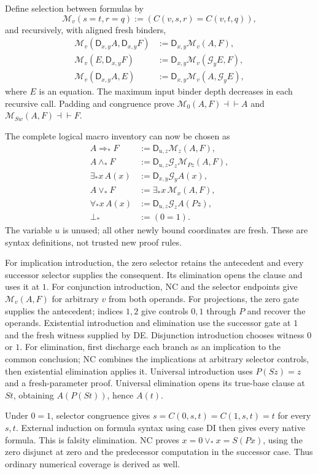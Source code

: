 \documentclass[11pt]{article}
\theoremstyle{definition}
\newcommand{\D}{\mathsf D}
\newcommand{\G}{\mathcal G}
\newcommand{\M}{\mathcal M}
\begin{document}
Define selection between formulas by
\[
 \M_v(s=t,r=q):=(C(v,s,r)=C(v,t,q)),
\]
and recursively, with aligned fresh binders,
\begin{align*}
 \M_v(\D_{x,y}A,\D_{x,y}F)&:=\D_{x,y}\M_v(A,F),\\
 \M_v(E,\D_{x,y}F)&:=\D_{x,y}\M_v(\G_yE,F),\\
 \M_v(\D_{x,y}A,E)&:=\D_{x,y}\M_v(A,\G_yE),
\end{align*}
where $E$ is an equation. The maximum input binder depth decreases in
each recursive call. Padding and congruence prove
$\M_0(A,F)\dashv\vdash A$ and
$\M_{Sw}(A,F)\dashv\vdash F$.

The complete logical macro inventory can now be chosen as
\begin{align}
 A\Rightarrow_*F&:=\D_{u,z}\M_z(A,F),\nonumber\\
 A\land_*F&:=\D_{u,z}\G_z\M_{Pz}(A,F),\nonumber\\
 \exists_*x\,A(x)&:=\D_{x,y}\G_yA(x),\nonumber\\
 A\lor_*F&:=\exists_*x\,\M_x(A,F),\nonumber\\
 \forall_*x\,A(x)&:=\D_{u,z}\G_zA(Pz),\nonumber\\
 \bot_*&:=(0=1).\label{eq:macros}
\end{align}
The variable $u$ is unused; all other newly bound coordinates are fresh.
These are syntax definitions, not trusted new proof rules.

For implication introduction, the zero selector retains the antecedent
and every successor selector supplies the consequent. Its elimination
opens the clause and uses it at $1$. For conjunction introduction, NC
and the selector endpoints give $\M_v(A,F)$ for arbitrary $v$ from
both operands. For projections, the zero gate supplies the antecedent;
indices $1,2$ give controls $0,1$ through $P$ and recover the operands.
Existential introduction and elimination use the successor gate at $1$
and the fresh witness supplied by DE. Disjunction introduction chooses
witness $0$ or $1$. For elimination, first discharge each branch as
an implication to the common conclusion; NC combines the implications
at arbitrary selector controls, then existential elimination applies it.
Universal introduction uses $P(Sz)=z$ and a fresh-parameter proof.
Universal elimination opens its true-base clause at $St$, obtaining
$A(P(St))$, hence $A(t)$.

Under $0=1$, selector congruence gives
$s=C(0,s,t)=C(1,s,t)=t$ for every $s,t$. External induction on
formula syntax using case DI then gives every native formula. This
is falsity elimination. NC proves
$x=0\lor_*x=S(Px)$, using the zero disjunct at zero and the
predecessor computation in the successor case. Thus ordinary numerical
coverage is derived as well.
\end{document}
